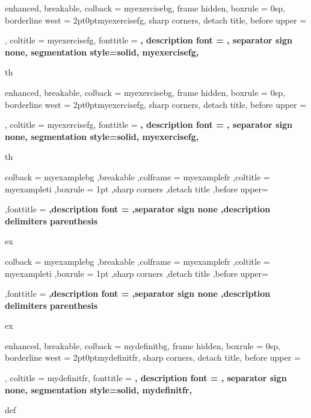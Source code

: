 
{%
	enhanced,
	breakable,
	colback = myexercisebg,
	frame hidden,
	boxrule = 0sp,
	borderline west = {2pt}{0pt}{myexercisefg},
	sharp corners,
	detach title,
	before upper = \tcbtitle\par\smallskip,
	coltitle = myexercisefg,
	fonttitle = \bfseries\sffamily,
	description font = \mdseries,
	separator sign none,
	segmentation style={solid, myexercisefg},
}
{th}

{%
	enhanced,
	breakable,
	colback = myexercisebg,
	frame hidden,
	boxrule = 0sp,
	borderline west = {2pt}{0pt}{myexercisefg},
	sharp corners,
	detach title,
	before upper = \tcbtitle\par\smallskip,
	coltitle = myexercisefg,
	fonttitle = \bfseries\sffamily,
	description font = \mdseries,
	separator sign none,
	segmentation style={solid, myexercisefg},
}
{th}


{%
	colback = myexamplebg
	,breakable
	,colframe = myexamplefr
	,coltitle = myexampleti
	,boxrule = 1pt
	,sharp corners
	,detach title
	,before upper=\tcbtitle\par\smallskip
	,fonttitle = \bfseries
	,description font = \mdseries
	,separator sign none
	,description delimiters parenthesis
}
{ex}

{%
	colback = myexamplebg
	,breakable
	,colframe = myexamplefr
	,coltitle = myexampleti
	,boxrule = 1pt
	,sharp corners
	,detach title
	,before upper=\tcbtitle\par\smallskip
	,fonttitle = \bfseries
	,description font = \mdseries
	,separator sign none
	,description delimiters parenthesis
}
{ex}


{
	enhanced,
	breakable,
	colback = mydefinitbg,
	frame hidden,
	boxrule = 0sp,
	borderline west = {2pt}{0pt}{mydefinitfr},
	sharp corners,
	detach title,
	before upper = \tcbtitle\par\smallskip,
	coltitle = mydefinitfr,
	fonttitle = \bfseries\sffamily,
	description font = \mdseries,
	separator sign none,
	segmentation style={solid, mydefinitfr},
}
{def}

